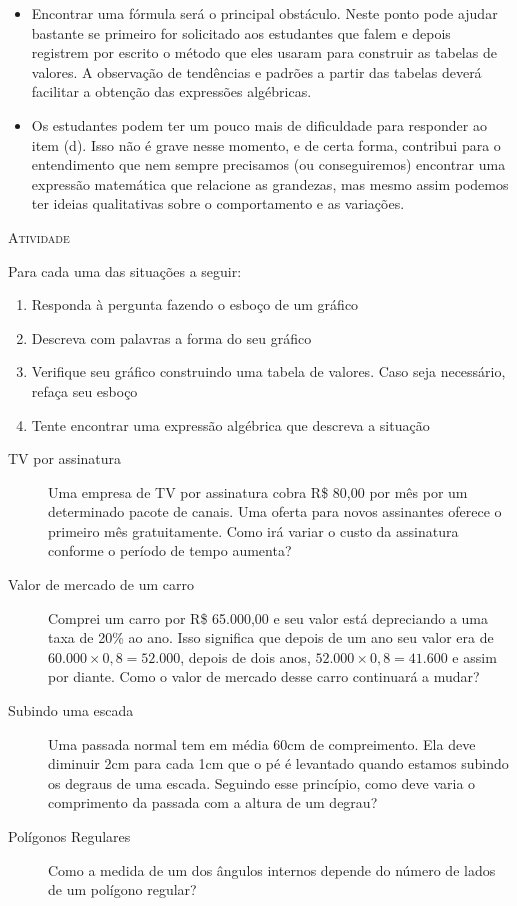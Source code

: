 \documentclass[10 pt,usenames,dvipsnames, oneside]{article}
\begin{document}
\begin{goals}
\begin{itemize}
\item Encontrar uma fórmula será o principal obstáculo. Neste ponto pode ajudar bastante se
primeiro for solicitado aos estudantes que falem e depois registrem por escrito o
método que eles usaram para construir as tabelas de valores. A observação de
tendências e padrões a partir das tabelas deverá facilitar a obtenção das expressões
algébricas.

\item Os estudantes podem ter um pouco mais de dificuldade para responder ao item (d). Isso
não é grave nesse momento, e de certa forma, contribui para o entendimento que nem
sempre precisamos (ou conseguiremos) encontrar uma expressão matemática que
relacione as grandezas, mas mesmo assim podemos ter ideias qualitativas sobre o
comportamento e as variações.

\end{itemize}
\end{goals}

\bigskip
\begin{center}
{\large \scshape Atividade}
\end{center}
\fi

Para cada uma das situações a seguir:
\begin{enumerate}
\item Responda à pergunta fazendo o esboço de um gráfico
\item Descreva com palavras a forma do seu gráfico
\item Verifique seu gráfico construindo uma tabela de valores. Caso seja necessário, refaça seu esboço
\item Tente encontrar uma expressão algébrica que descreva a situação
\end{enumerate}

\begin{description}\item[TV por assinatura]
Uma empresa de TV por assinatura cobra R\$ 80,00 por mês por um determinado pacote de canais. Uma oferta para novos assinantes oferece o primeiro mês gratuitamente. Como irá variar o custo da assinatura conforme o período de tempo aumenta?
\item[Valor de mercado de um carro]
Comprei um carro por R\$ 65.000,00 e seu valor está depreciando a uma taxa de 20\% ao ano. Isso significa que depois de um ano seu valor era de $60.000\times 0,8=52.000$, depois de dois anos, $52.000\times 0,8=41.600$ e assim por diante. Como o valor de mercado desse carro continuará a mudar?
\item[Subindo uma escada]
Uma passada normal tem em média 60cm de compreimento. Ela deve diminuir 2cm para cada 1cm que o pé é levantado quando estamos subindo os degraus de uma escada. Seguindo esse princípio, como deve varia o comprimento da passada com a altura de um degrau?
\item[Polígonos Regulares]
Como a medida de um dos ângulos internos depende do número de lados de um polígono regular?
\end{description}
\end{document}
